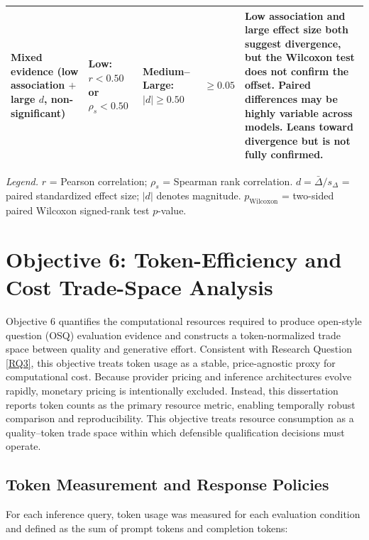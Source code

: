 \begin{table}[htbp]
{\begin{tabular}{p{3.1cm} p{2.8cm} p{2.4cm} p{2.0cm} p{8.7cm}}
Mixed evidence (low association $+$ large $d$, non-significant) &
\makecell[l]{Low:\\ $r < 0.50$\\ or $\rho_s < 0.50$} &
\makecell[l]{Medium--Large:\\ $|d| \ge 0.50$} &
$\ge 0.05$ &
Low association and large effect size both suggest divergence, but the Wilcoxon test does not confirm the offset. Paired differences may be highly variable across models. Leans toward divergence but is not fully confirmed. \\
\bottomrule
\end{tabular}%
} %

\vspace{0.5em}
\footnotesize
\textit{Legend.}
$r$ = Pearson correlation; $\rho_s$ = Spearman rank correlation.
$d=\bar{\Delta}/s_{\Delta}$ = paired standardized effect size; $|d|$ denotes magnitude.
$p_{\text{Wilcoxon}}$ = two-sided paired Wilcoxon signed-rank test $p$-value.
\end{table}


\clearpage

\section{Objective 6: Token-Efficiency and Cost Trade-Space Analysis}
\label{sec:ch3_obj6}

Objective 6 quantifies the computational resources required to produce open-style question (OSQ) evaluation evidence and constructs a token-normalized trade space between quality and generative effort. Consistent with Research Question \ref{RQ3}, this objective treats token usage as a stable, price-agnostic proxy for computational cost. Because provider pricing and inference architectures evolve rapidly, monetary pricing is intentionally excluded. Instead, this dissertation reports token counts as the primary resource metric, enabling temporally robust comparison and reproducibility. This objective treats resource consumption as a quality--token trade space within which defensible qualification decisions must operate.


\subsection{Token Measurement and Response Policies}
\label{subsec:ch3_obj6_measurement}

For each inference query, token usage was measured for each evaluation condition and defined as the sum of prompt tokens and completion tokens:

